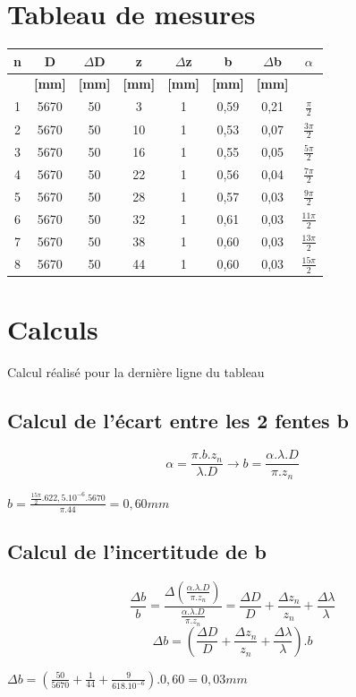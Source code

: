 \documentclass[11pt,a4paper]{report}
\begin{document}
	\section{Tableau de mesures}
	\begin{center}		
	\begin{tabular}{|c|c|c|c|c|c|c|c|}
		\hline
		\bf n & \bf D & \bf $\Delta$D & \bf z & \bf $\Delta$z & \bf b & \bf $\Delta$b & \bf $\alpha$ \\
		\hline
		 & \bf [mm] & \bf [mm] & \bf [mm] & \bf [mm] & \bf [mm]  & \bf [mm]  &  \\
		\hline
		1 & 5670 & 50 & 3 &   1&0,59& 0,21 & $\frac{\pi}{2}$\\
		2 & 5670 & 50 & 10 &  1&0,53& 0,07 & $\frac{3\pi}{2}$\\
		3 & 5670 & 50 & 16 &  1&0,55&  0,05& $\frac{5\pi}{2}$\\
		4 & 5670 & 50 & 22 &  1&0,56&  0,04& $\frac{7\pi}{2}$\\
		5 & 5670 & 50 & 28 &  1&0,57&  0,03& $\frac{9\pi}{2}$\\
		6 & 5670 & 50 & 32 &  1&0,61&  0,03& $\frac{11\pi}{2}$\\
		7 & 5670 & 50 & 38 &  1&0,60&  0,03& $\frac{13\pi}{2}$\\
		8 & 5670 & 50 & 44 &  1&0,60 & 0,03 & $\frac{15\pi}{2}$\\
		\hline
	\end{tabular}
	\end{center}
	\section{Calculs}
		Calcul réalisé pour la dernière ligne du tableau
		\subsection{Calcul de l'écart entre les 2 fentes b}
		\begin{equation}
		\alpha = \frac{\pi.b.z_{n}}{\lambda.D} \rightarrow b = \frac{\alpha .\lambda.D }{\pi.z_{n}} 
		\end{equation}
\begin{center}$ b = \frac{\frac{15\pi}{2}.622,5.10^{-6}.5670}{\pi.44} = 0,60 mm$\end{center}
		\subsection{Calcul de l'incertitude de b}
		\begin{equation}
		\frac{\Delta b}{b} = \frac{\Delta\left(\frac{\alpha .\lambda.D }{\pi.z_{n}}\right)}{\frac{\alpha .\lambda.D }{\pi.z_{n}}} 
		= \frac{\Delta D}{D}+\frac{\Delta z_{n}}{z_{n}} + \frac{\Delta \lambda}{\lambda}
		\end{equation}
		\begin{equation}
		\Delta b
		= \left(\frac{\Delta D}{D}+\frac{\Delta z_{n}}{z_{n}} + \frac{\Delta \lambda}{\lambda}\right).b
		\end{equation}
		\begin{center}
		$\Delta b = \left(\frac{50}{5670}+\frac{1}{44} + \frac{9}{618.10^{-6}}\right).0,60 = 0,03mm $
		\end{center}
\end{document}

